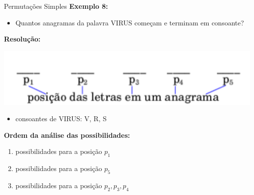 \documentclass[aspectratio=169]{beamer}
\begin{document}
\begin{frame}{Permutações Simples}
    \textbf{Exemplo 8:}

    \vspace{2mm}

    \begin{itemize}
        \item[] Quantos anagramas da palavra VIRUS começam e terminam em consoante?
    \end{itemize}

    \textbf{Resolução:}

    \begin{center}
        \includegraphics[width=0.5\linewidth]{figs/Exemplo8_2.png}
    \end{center}

    \pause
    \begin{itemize}
        \item consoantes de VIRUS: V, R, S
    \end{itemize}

    \pause
    \textbf{Ordem da análise das possibilidades:}
    \begin{enumerate}[1)]
        \item possibilidades para a posição $p_1$ \pause 
        \item possibilidades para a posição $p_5$ \pause 
        \item possibilidades para a posição $p_2, p_3, p_4$
    \end{enumerate}

\end{frame}
\end{document}
